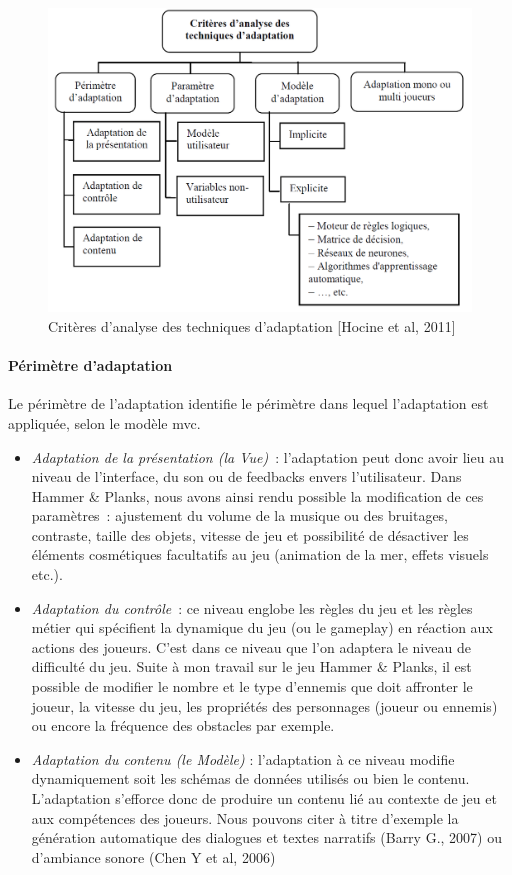 \begin{figure}[!hbtp]
	\centering
	\includegraphics[width=1\linewidth]{images/criteres_adaptation.png}
	\caption{Critères d’analyse des techniques d’adaptation [Hocine et al, 2011]\cite{Hoci11}}
	\label{criteres_adaptation}
\end{figure}

	\paragraph{Périmètre d'adaptation\\}
Le périmètre de l'adaptation identifie le périmètre dans lequel l'adaptation est appliquée, selon le modèle \gls{mvc}. 
\begin{itemize}
	\item \emph{Adaptation de la présentation (la Vue)}~: l'adaptation peut donc avoir lieu au niveau de l'interface, du son ou de feedbacks envers l'utilisateur. Dans Hammer \& Planks, nous avons ainsi rendu possible la modification de ces paramètres~: ajustement du volume de la musique ou des bruitages, contraste, taille des objets, vitesse de jeu et possibilité de désactiver les éléments cosmétiques facultatifs au jeu (animation de la mer, effets visuels etc.).
		\item  \emph{Adaptation du contrôle}~: ce niveau englobe les règles du jeu et les règles métier qui spécifient la dynamique du jeu (ou le gameplay) en réaction aux actions des joueurs. C'est dans ce niveau que l'on adaptera le niveau de difficulté du jeu. Suite à mon travail sur le jeu Hammer \& Planks, il est possible de modifier le nombre et le type d'ennemis que doit affronter le joueur, la vitesse du jeu, les propriétés des personnages (joueur ou ennemis) ou encore la fréquence des obstacles par exemple.
		\item  \emph{Adaptation du contenu (le Modèle)} : l'adaptation à ce niveau modifie dynamiquement soit les schémas de données utilisés ou bien le contenu. L'adaptation s'efforce donc de produire un contenu lié au contexte de jeu et aux compétences des joueurs. Nous pouvons citer à titre d'exemple la génération automatique des dialogues et textes narratifs (Barry G., 2007) ou d'ambiance sonore (Chen Y et al, 2006)
\end{itemize} 


